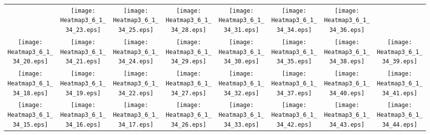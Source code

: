 \documentclass{standalone}
\begin{document}
\renewcommand{\arraystretch}{0}
\setlength{\tabcolsep}{0pt}
\begin{tabular}{ *8{c} }
 & \texttt{[image: Heatmap3\_6\_1\_34\_23.eps]} & \texttt{[image: Heatmap3\_6\_1\_34\_25.eps]} & \texttt{[image: Heatmap3\_6\_1\_34\_28.eps]} & \texttt{[image: Heatmap3\_6\_1\_34\_31.eps]} & \texttt{[image: Heatmap3\_6\_1\_34\_34.eps]} & \texttt{[image: Heatmap3\_6\_1\_34\_36.eps]} &  \\
\texttt{[image: Heatmap3\_6\_1\_34\_20.eps]} & \texttt{[image: Heatmap3\_6\_1\_34\_21.eps]} & \texttt{[image: Heatmap3\_6\_1\_34\_24.eps]} & \texttt{[image: Heatmap3\_6\_1\_34\_29.eps]} & \texttt{[image: Heatmap3\_6\_1\_34\_30.eps]} & \texttt{[image: Heatmap3\_6\_1\_34\_35.eps]} & \texttt{[image: Heatmap3\_6\_1\_34\_38.eps]} & \texttt{[image: Heatmap3\_6\_1\_34\_39.eps]} \\
\texttt{[image: Heatmap3\_6\_1\_34\_18.eps]} & \texttt{[image: Heatmap3\_6\_1\_34\_19.eps]} & \texttt{[image: Heatmap3\_6\_1\_34\_22.eps]} & \texttt{[image: Heatmap3\_6\_1\_34\_27.eps]} & \texttt{[image: Heatmap3\_6\_1\_34\_32.eps]} & \texttt{[image: Heatmap3\_6\_1\_34\_37.eps]} & \texttt{[image: Heatmap3\_6\_1\_34\_40.eps]} & \texttt{[image: Heatmap3\_6\_1\_34\_41.eps]} \\
\texttt{[image: Heatmap3\_6\_1\_34\_15.eps]} & \texttt{[image: Heatmap3\_6\_1\_34\_16.eps]} & \texttt{[image: Heatmap3\_6\_1\_34\_17.eps]} & \texttt{[image: Heatmap3\_6\_1\_34\_26.eps]} & \texttt{[image: Heatmap3\_6\_1\_34\_33.eps]} & \texttt{[image: Heatmap3\_6\_1\_34\_42.eps]} & \texttt{[image: Heatmap3\_6\_1\_34\_43.eps]} & \texttt{[image: Heatmap3\_6\_1\_34\_44.eps]} \\

\end{tabular}
\end{document}
